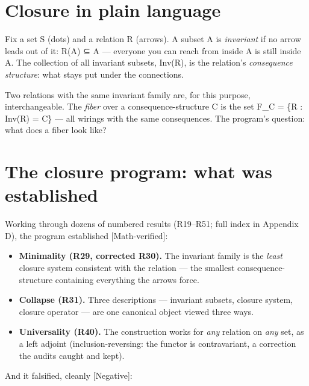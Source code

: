 \documentclass[
  11pt,
]{book}
\providecommand{\tightlist}{%
  \setlength{\itemsep}{0pt}\setlength{\parskip}{0pt}}
\begin{document}
\section{Closure in plain language}\label{closure-in-plain-language}

Fix a set S (dots) and a relation R (arrows). A subset A is
\emph{invariant} if no arrow leads out of it: R(A) ⊆ A --- everyone you
can reach from inside A is still inside A. The collection of all
invariant subsets, Inv(R), is the relation's \emph{consequence
structure}: what stays put under the connections.

Two relations with the same invariant family are, for this purpose,
interchangeable. The \emph{fiber} over a consequence-structure C is the
set F\_C = \{R : Inv(R) = C\} --- all wirings with the same
consequences. The program's question: what does a fiber look like?

\section{The closure program: what was
established}\label{the-closure-program-what-was-established}

Working through dozens of numbered results (R19--R51; full index in
Appendix D), the program established {[}Math-verified{]}:

\begin{itemize}
\tightlist
\item
  \textbf{Minimality (R29, corrected R30).} The invariant family is the
  \emph{least} closure system consistent with the relation --- the
  smallest consequence-structure containing everything the arrows force.
\item
  \textbf{Collapse (R31).} Three descriptions --- invariant subsets,
  closure system, closure operator --- are one canonical object viewed
  three ways.
\item
  \textbf{Universality (R40).} The construction works for \emph{any}
  relation on \emph{any} set, as a left adjoint (inclusion-reversing:
  the functor is contravariant, a correction the audits caught and
  kept).
\end{itemize}

And it falsified, cleanly {[}Negative{]}:
\end{document}
